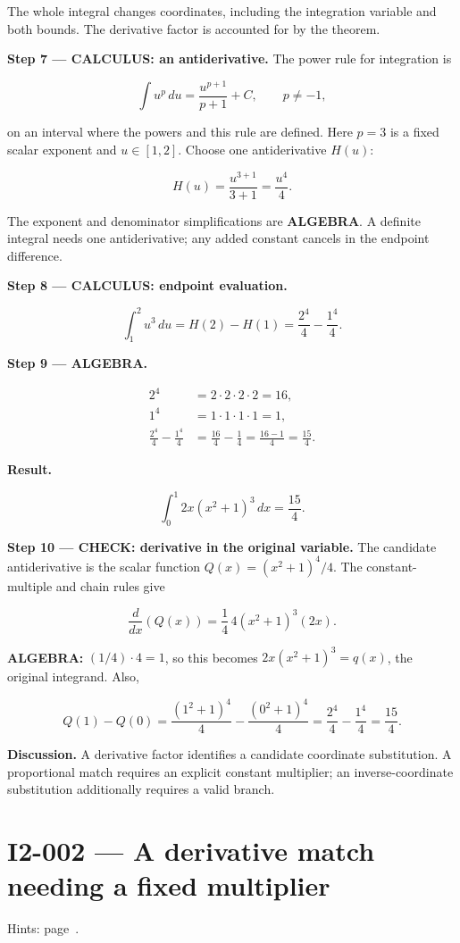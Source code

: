 \documentclass[11pt,oneside,openany]{book}
\begin{document}
The whole integral changes coordinates, including the integration variable and both bounds. The derivative factor is accounted for by the theorem.

\textbf{Step 7 --- CALCULUS: an antiderivative.} The power rule for integration is

\[
\int u^p\,du=\frac{u^{p+1}}{p+1}+C,\qquad p\ne-1,
\]

on an interval where the powers and this rule are defined. Here \(p=3\) is a fixed scalar exponent and \(u\in[1,2]\). Choose one antiderivative \(H(u)\):

\[
H(u)=\frac{u^{3+1}}{3+1}=\frac{u^4}{4}.
\]

The exponent and denominator simplifications are \textbf{ALGEBRA}. A definite integral needs one antiderivative; any added constant cancels in the endpoint difference.

\textbf{Step 8 --- CALCULUS: endpoint evaluation.}

\[
\int_{1}^{2} u^3\,du=H(2)-H(1)=\frac{2^4}{4}-\frac{1^4}{4}.
\]

\begingroup\color{AlgebraBlue}
\textbf{Step 9 --- ALGEBRA.}

\[
\begin{aligned}
2^4&=2\cdot2\cdot2\cdot2=16,\\
1^4&=1\cdot1\cdot1\cdot1=1,\\
\frac{2^4}{4}-\frac{1^4}{4}
&=\frac{16}{4}-\frac{1}{4}
=\frac{16-1}{4}
=\frac{15}{4}.
\end{aligned}
\]

\endgroup
\textbf{Result.}

\[
\boxed{\int_{0}^{1} 2x(x^2+1)^3\,dx=\frac{15}{4}.}
\]

\textbf{Step 10 --- CHECK: derivative in the original variable.} The candidate antiderivative is the scalar function \(Q(x)=(x^2+1)^4/4\). The constant-multiple and chain rules give

\[
\frac{d}{dx}\left(Q(x)\right)
=\frac14\,4(x^2+1)^3(2x).
\]

\textbf{ALGEBRA:} \((1/4)\cdot4=1\), so this becomes \(2x(x^2+1)^3=q(x)\), the original integrand. Also,

\[
Q(1)-Q(0)=\frac{(1^2+1)^4}{4}-\frac{(0^2+1)^4}{4}
=\frac{2^4}{4}-\frac{1^4}{4}=\frac{15}{4}.
\]

\textbf{Discussion.} A derivative factor identifies a candidate coordinate substitution. A proportional match requires an explicit constant multiplier; an inverse-coordinate substitution additionally requires a valid branch.
\clearpage
\section{I2-002 --- A derivative match needing a fixed multiplier}
\label{problem:I2-002}
{\small Hints: page~\pageref{hints:I2-002}.}\par\medskip
\end{document}
